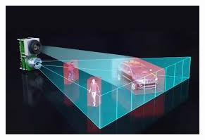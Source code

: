 \begin{figure}[h]
	\centering
	\includegraphics[width=0.3\linewidth]{img/lidar}
	\caption{}
	\label{fig:lidar}
\end{figure}
